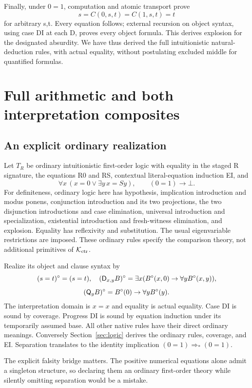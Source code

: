 Finally, under $0=1$, computation and atomic transport prove
\[
                   s=C(0,s,t)=C(1,s,t)=t
\]
for arbitrary s,t. Every equation follows; external recursion on object
syntax, using case DI at each D, proves every object formula. This
derives explosion for the designated absurdity. We have thus derived
the full intuitionistic natural-deduction rules, with actual equality,
without postulating excluded middle for quantified formulas.

\section{Full arithmetic and both interpretation composites}
\label{sec:interpretations}

\subsection{An explicit ordinary realization}

Let $T_R$ be ordinary intuitionistic first-order logic with equality
in the staged R signature, the equations R0 and RS, contextual
literal-equation induction EI, and
\[
 \forall x\,(x=0\vee\exists y\,x=Sy),\qquad (0=1)\to\bot.
 \tag{Boundary}
\]
For definiteness, ordinary logic here has hypothesis, implication
introduction and modus ponens, conjunction introduction and its two
projections, the two disjunction introductions and case elimination,
universal introduction and specialization, existential introduction and
fresh-witness elimination, and explosion. Equality has reflexivity and
substitution. The usual eigenvariable restrictions are imposed. These
ordinary rules specify the comparison theory, not additional primitives
of $\mathcal K_{\mathrm{ctr}}$.

Realize its object and clause syntax by
\[
 (s=t)^\circ=(s=t),\quad
 (\mathsf D_{x,y}B)^\circ=\exists x(B^\circ(x,0)\to\forall yB^\circ(x,y)),
\]
\[
                 (\mathsf Q_yB)^\circ=B^\circ(0)\to\forall yB^\circ(y).
\]
The interpretation domain is $x=x$ and equality is actual equality.
Case DI is sound by coverage. Progress DI is sound by equation
induction under its temporarily assumed base. All other native rules
have their direct ordinary meanings. Conversely Section~\ref{sec:logic}
derives the ordinary rules, coverage, and EI. Separation translates to
the identity implication $(0=1)\Rightarrow_*(0=1)$.

The explicit falsity bridge matters. The positive numerical equations
alone admit a singleton structure, so declaring them an ordinary
first-order theory while silently omitting separation would be a mistake.

